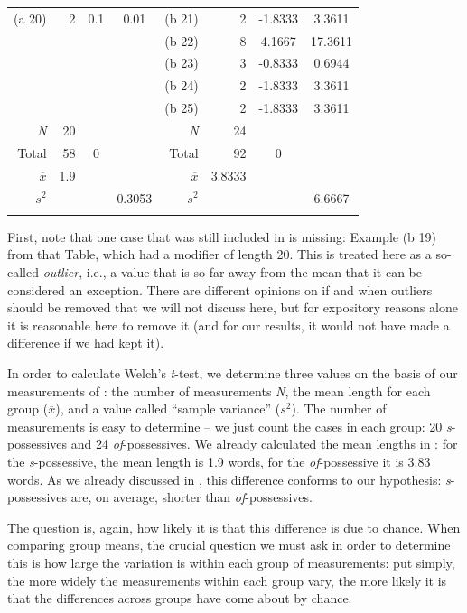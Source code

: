\begin{table}
\begin{tabular}[t]{rrS[table-format=-1.1]c@{\hspace{4\tabcolsep}}rrS[table-format=-1.4]S[table-format=2.4]}
(a 20) & 2 & 0.1 & 0.01 & (b 21) & 2 & -1.8333 & 3.3611 \\
 & & & & (b 22) & 8 & 4.1667 & 17.3611 \\
 & & & & (b 23) & 3 & -0.8333 & 0.6944 \\
 & & & & (b 24) & 2 & -1.8333 & 3.3611 \\
 & & & & (b 25) & 2 & -1.8333 & 3.3611 \\
\midrule
\textit{N} & 20 & &  & \textit{N} & 24 & & \\
Total & 58 & 0 &  & Total & 92 & 0 & \\
$\overline{x}$ & 1.9 & & & $\overline{x}$ & 3.8333 & & \\
$s^2$ & & & 0.3053  & $s^2$ & & & 6.6667 \\
\lspbottomrule
\end{tabular}
\end{table}

First, note that one case that was still included in  is missing: Example (b 19) from that Table, which had a modifier of length  20. This is treated here as a so\hyp{}called \emph{outlier}, i.e., a value that is so far away from the mean that it can be considered an exception. There are different opinions on if and when outliers should be removed that we will not discuss here, but for expository reasons alone it is reasonable here to remove it (and for our results, it would not have made a difference if we had kept it).

In order to calculate Welch's \textit{t}-test,  we determine three values on the basis of our measurements  of :  the number of measurements \textit{N}, the mean  length for each group ($\overline{x}$), and a value called ``sample variance''  ($s^2$). The number of measurements is easy to determine -- we just count the cases in each group: 20 \textit{s}-possessives  and 24 \textit{of}-possessives. We already calculated the mean  lengths in : for the \textit{s}-possessive, the mean length  is 1.9 words, for the \textit{of}-possessive it is 3.83 words. As we already discussed in , this difference conforms to our hypothesis: \textit{s}-possessives are, on average, shorter than  \textit{of}-possessives.

The question is, again, how likely it is that this difference is due to chance.  When comparing group means, the crucial question we must ask in order to determine this is how large the variation  is within each group of measurements:  put simply, the more widely the measurements within each group vary, the more likely it is that the differences across groups have come about by  chance.

